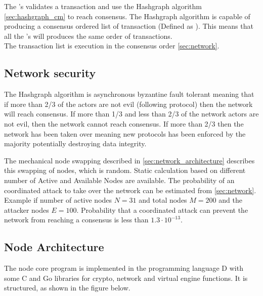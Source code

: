 The 's validates a transaction and use the Hashgraph algorithm \cref{sec:hashgraph_cm} to reach consensus. The Hashgraph algorithm is capable of producing a consensus ordered list of transaction (Defined as ). This means that all the 's will produces the same order of transactions.\\
The transaction list is execution in the consensus order \cref{sec:network}.

\subsection{Network security}

The Hashgraph algorithm is asynchronous byzantine fault tolerant meaning that if more than 2/3 of the actors are not evil (following protocol) then the network will reach consensus. If more than 1/3 and less than 2/3 of the network actors are not evil, then the network cannot reach consensus. If more than 2/3 then the network has been taken over meaning new protocols has been enforced by the majority potentially destroying data integrity. 

The mechanical node swapping described in \cref{sec:network_architecture} describes this swapping of nodes, which is  random. Static calculation based on different number of Active and Available Nodes are available.
The probability of an coordinated attack to take over the network can be estimated from \cref{sec:network}.\\

Example if number of active nodes $N=31$ and total nodes $M=200$ and the attacker nodes $E=100$.
Probability that a coordinated attack can prevent the network from reaching a consensus is less than $1.3 \cdot 10^{-13}$.

\subsection{Node Architecture}
The node core program is implemented in the programming language D with some C and Go libraries for crypto, network and virtual engine functions. It is structured, as shown in the figure below. 

